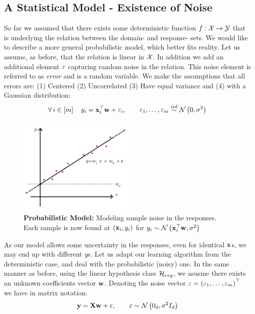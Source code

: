 \subsection{A Statistical Model - Existence of Noise}\label{lin_reg_stat_model}
So far we assumed that there exists some deterministic function $f:\mathcal{X}\rightarrow\mathcal{Y}$ that is underlying the relation between the domain- and response- sets. We would like to describe a more general probabilistic model, which better fits reality. Let us assume, as before, that the relation is linear in $\mathcal{X}$. In addition we add an additional element $\varepsilon$ capturing random noise in the relation. This noise element is referred to as \textit{error} and is a random variable. We make the assumptions that all errors are: (1) Centered (2) Uncorrelated (3) Have equal variance and (4) with a Gaussian distribution:
\begin{equation}
\forall\, i \in \left[m\right] \quad y_i=\mathbf{x}_i^\top\mathbf{w} + \varepsilon_i, \quad\quad \varepsilon_1,\ldots,\varepsilon_m \overset{iid}{\sim} \mathcal{N}\left(0,\sigma^2\right)
\label{eqn:lin_reg_prob_model}
\end{equation}

\begin{figure}[!h]
	\centering
	\includegraphics[width=0.5\textwidth]{chapters/intro.regression/figures/2_3.png}
	\caption{\textbf{Probabilistic Model:} Modeling sample noise in the responses. Each sample is now found at $\left(\mathbf{x}_i,y_i\right)$ for $y_i\sim\mathcal{N}\left(\mathbf{x}_i^\top \mathbf{w},\sigma^2\right)$}
\end{figure}

As our model allows some uncertainty in the responses, even for identical $\mathbf{x}$s, we may end up with different $y$s. Let us adapt our learning algorithm from the deterministic case, and deal with the probabilistic (noisy) one. In the same manner as before, using the linear hypothesis class $\mathcal{H}_{reg}$,  we asusme there exists an unknown coefficients vector $\mathbf{w}$. Denoting the noise vector $\varepsilon=\left(\varepsilon_1,\ldots,\varepsilon_m\right)^\top$ we have in matrix notation: 
\begin{equation}
\mathbf{y}=\mathbf{X}\mathbf{w}+\varepsilon, \quad\quad \varepsilon\sim\mathcal{N}\left(0_d,\sigma^2I_d\right)
\label{eqn:lin_reg_prob_model2}
\end{equation}



